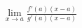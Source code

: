 \documentclass[preview]{standalone}
\begin{document}
\begin{align*}
\lim_{x \to a} \frac{f'(a)(x-a)}{g'(a)(x-a)}
\end{align*}
\end{document}
